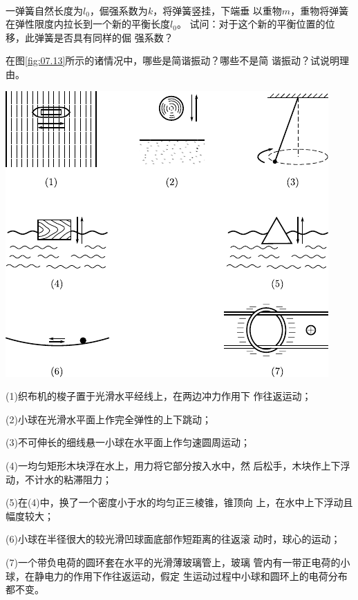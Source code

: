 ~\vspace{2em}
\begin{questions}

\question 一弹簧自然长度为$ l _ { 0 } $，倔强系数为$ k $，将弹簧竖挂，下端垂
以重物$ m $，重物将弹簧在弹性限度内拉长到一个新的平衡长度$ l _ { 0 } $。
试问：对于这个新的平衡位置的位移，此弹簧是否具有同样的倔
强系数？

\question 在图\ref{fig:07.13}\;所示的诸情况中，哪些是简谐振动？哪些不是简
谐振动？试说明理由。
\begin{figurex}
 \centering
 \includegraphics{figure/fig07.13}
 \caption{}
 \label{fig:07.13}
\end{figurex}

(1)织布机的梭子置于光滑水平经线上，在两边冲力作用下
作往返运动；

(2)小球在光滑水平面上作完全弹性的上下跳动；

(3)不可伸长的细线悬一小球在水平面上作匀速圆周运动；

(4)一均匀矩形木块浮在水上，用力将它部分按入水中，然
后松手，木块作上下浮动，不计水的粘滞阻力；

(5)在(4)中，换了一个密度小于水的均匀正三棱锥，锥顶向
上，在水中上下浮动且幅度较大；

(6)小球在半径很大的较光滑凹球面底部作短距离的往返滚
动时，球心的运动；

(7)一个带负电荷的圆环套在水平的光滑薄玻璃管上，玻璃
管内有一带正电荷的小球，在静电力的作用下作往返运动，假定
生运动过程中小球和圆环上的电荷分布都不变。


\end{questions}
